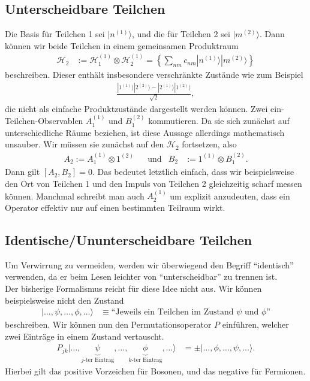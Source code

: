 \documentclass[english, parskip=full]{scrreport}
\newcommand{\klam}{}
\newcommand{\klammer}{}
\newcommand{\tecxt}{}
\newcommand{\Ket}{}
\begin{document}
\subsection{Unterscheidbare Teilchen}
Die Basis für Teilchen 1 sei $\Ket | n^{(1)} \rangle$, und die für Teilchen 2 sei $\Ket | m^{(2)} \rangle$.
Dann können wir beide Teilchen in einem gemeinsamen Produktraum
\begin{align}
\mathcal{H}_2 &:= \mathcal{H}_1^{(1)} \otimes \mathcal{H}_2^{(1)} = \klammer\left\{ \sum_{nm} c_{nm} \Ket | n^{(1)} \rangle \Ket | m^{(2)} \rangle \right\}
\end{align}
beschreiben.
Dieser enthält insbesondere verschränkte Zustände wie zum Beispiel
\begin{align}
\frac{\Ket | 1^{(1)} \rangle \Ket | 2^{(2)} \rangle - \Ket | 2^{(1)} \rangle \Ket | 1^{(2)} \rangle}{\sqrt{2}},
\end{align}
die nicht als einfache Produktzustände dargestellt werden können.
Zwei ein-Teilchen-Observablen $A_1^{(1)}$ und $B_1^{(2)}$ kommutieren.
Da sie sich zunächst auf unterschiedliche Räume beziehen, ist diese Aussage allerdings mathematisch unsauber.
Wir müssen sie zunächst auf den $\mathcal{H}_2$ fortsetzen, also
\begin{align}
A_2 := A_1^{(1)}\otimes 1^{(2)} &&\tecxt\text{und} & B_2 &:= 1^{(1)} \otimes B_1^{(2)}.
\end{align}
Dann gilt $\klam\left[ A_2, B_2 \right] = 0$.
Das bedeutet letztlich einfach, dass wir beispielsweise den Ort von Teilchen 1 und den  Impuls von Teilchen 2 gleichzeitig scharf messen können.
Manchmal schreibt man auch $A_2^{(1)}$ um explizit anzudeuten, dass ein Operator effektiv nur auf einen bestimmten Teilraum wirkt.
\subsection{Identische/Ununterscheidbare Teilchen}
Um Verwirrung zu vermeiden, werden wir überwiegend den Begriff ``identisch'' verwenden, da er beim Lesen leichter von ``unterscheidbar'' zu trennen ist.
\\
Der bisherige Formalismus reicht für diese Idee nicht aus.
Wir können beispielsweise nicht den Zustand
\begin{align}
\Ket | \dots, \psi, \dots,\phi, \dots \rangle &\equiv \text{``Jeweils ein Teilchen im Zustand }\psi\tecxt\text{ und }\phi\tecxt\text{''}
\end{align}
beschreiben.
Wir können nun den Permutationsoperator $P$ einführen, welcher zwei Einträge in einem Zustand vertauscht.
\begin{align}
P_{jk} \Ket | \dots, \underbrace{\psi}_{j\tecxt\text{-ter Eintrag}}, \dots,\underbrace{\phi}_{k\tecxt\text{-ter Eintrag}}, \dots \rangle &= \pm\Ket | \dots, \phi, \dots,\psi, \dots \rangle.
\end{align}
Hierbei gilt das positive Vorzeichen für Bosonen, und das negative für Fermionen.
\end{document}
